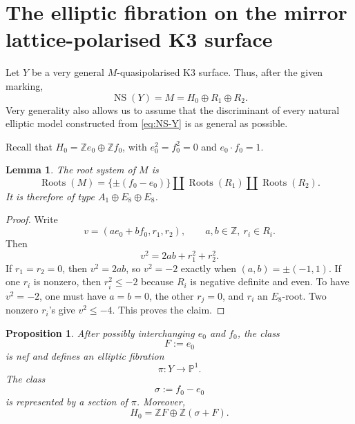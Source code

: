 \documentclass[11pt]{amsart}
\newtheorem{proposition}[theorem]{Proposition}
\newtheorem{lemma}[theorem]{Lemma}
\theoremstyle{definition}
\newcommand{\NS}{\operatorname{NS}}
\newcommand{\Roots}{\operatorname{Roots}}
\newcommand{\PP}{\mathbb P}
\newcommand{\ZZ}{\mathbb Z}
\begin{document}
\section{The elliptic fibration on the mirror lattice-polarised K3 surface}

Let $Y$ be a very general $M$-quasipolarised K3 surface.  Thus, after the
given marking,
\begin{equation}\label{eq:NS-Y}
\NS(Y)=M=H_0\oplus R_1\oplus R_2.
\end{equation}
Very generality also allows us to assume that the discriminant of every
natural elliptic model constructed from \eqref{eq:NS-Y} is as general as
possible.

Recall that $H_0=\ZZ e_0\oplus\ZZ f_0$, with $e_0^2=f_0^2=0$ and
$e_0\cdot f_0=1$.

\begin{lemma}\label{lem:root-system-M}
The root system of $M$ is
\[
\Roots(M)
 =
\{\pm(f_0-e_0)\}
 \amalg
\Roots(R_1)
 \amalg
\Roots(R_2).
\]
It is therefore of type $A_1\oplus E_8\oplus E_8$.
\end{lemma}

\begin{proof}
Write
\[
v=(a e_0+b f_0,r_1,r_2),
\qquad
a,b\in\ZZ,\ r_i\in R_i.
\]
Then
\[
v^2=2ab+r_1^2+r_2^2.
\]
If $r_1=r_2=0$, then $v^2=2ab$, so $v^2=-2$ exactly when
$(a,b)=\pm(-1,1)$.  If one $r_i$ is nonzero, then $r_i^2\leq -2$ because $R_i$
is negative definite and even.  To have $v^2=-2$, one must have $a=b=0$,
the other $r_j=0$, and $r_i$ an $E_8$-root.  Two nonzero $r_i$'s give
$v^2\leq -4$.  This proves the claim.
\end{proof}

\begin{proposition}\label{prop:construct-fibration}
After possibly interchanging $e_0$ and $f_0$, the class
\[
F:=e_0
\]
is nef and defines an elliptic fibration
\[
\pi\colon Y\longrightarrow \PP^1.
\]
The class
\[
\sigma:=f_0-e_0
\]
is represented by a section of $\pi$.  Moreover,
\begin{equation}\label{eq:U-from-fibration}
H_0=\ZZ F\oplus\ZZ(\sigma+F).
\end{equation}
\end{proposition}
\end{document}
